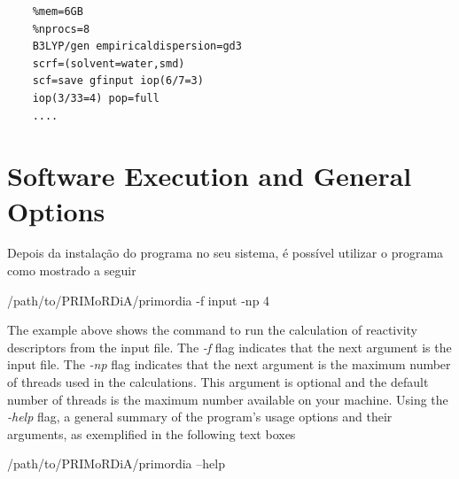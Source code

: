 \documentclass[a4paper,11pt]{refart}
\begin{document}
\newpage
\begin{minipage}{\textwidth}
	\begin{lstlisting}[caption={Exemplo de input para o GAUSSIAN},label={ls.gauss}]
	%chk=Fe_DFO_s2_nuevo.chk
	%mem=6GB
	%nprocs=8
	B3LYP/gen empiricaldispersion=gd3 
	scrf=(solvent=water,smd)
	scf=save gfinput iop(6/7=3)
	iop(3/33=4) pop=full
	....
	\end{lstlisting}
\end{minipage}

\newpage

\section{Software Execution and General Options}

Depois da instalação do programa no seu sistema, é possível utilizar o programa como mostrado a seguir

\hspace*{-\leftmarginwidth}
\begin{minipage}{\fullwidth}
	\begin{commandshell}
		/path/to/PRIMoRDiA/primordia -f input -np 4 	
	\end{commandshell}
\end{minipage}

The example above shows the command to run the calculation of reactivity descriptors from the input file. The \emph{-f} flag indicates that the next argument is the input file. The \emph{-np} flag indicates that the next argument is the maximum number of threads used in the calculations. This argument is optional and the default number of threads is the maximum number available on your machine. Using the \emph{-help} flag, a general summary of the program's usage options and their arguments, as exemplified in the following text boxes


\hspace*{-\leftmarginwidth}
\begin{minipage}{\fullwidth}
	\begin{commandshell}
		/path/to/PRIMoRDiA/primordia --help
	\end{commandshell}
\end{minipage}
\end{document}
